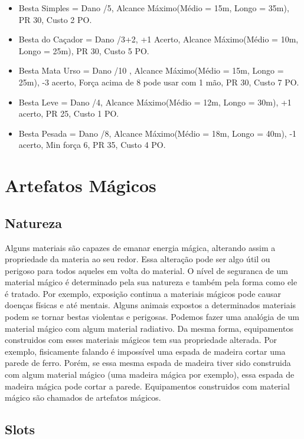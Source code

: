 \begin{itemize}	
	\item Besta Simples = Dano /5, Alcance Máximo(Médio = 15m, Longo = 35m), PR 30, Custo 2 PO.	
	\item Besta do Caçador = Dano /3+2, +1 Acerto, Alcance Máximo(Médio  = 10m, Longo = 25m), PR 30, Custo 5 PO.
	\item Besta Mata Urso = Dano /10 , Alcance Máximo(Médio  = 15m, Longo = 25m), -3 acerto, Força acima de 8 pode usar com 1 mão, PR 30, Custo 7 PO.
	\item Besta Leve = Dano /4, Alcance Máximo(Médio = 12m, Longo = 30m), +1 acerto, PR 25, Custo 1 PO.
	\item Besta Pesada = Dano /8, Alcance Máximo(Médio = 18m, Longo = 40m), -1 acerto, Min força 6, PR 35, Custo 4 PO.
\end{itemize}	



\section{Artefatos Mágicos}


\subsection{Natureza}
Alguns materiais são capazes de emanar energia mágica, alterando assim a propriedade da materia ao seu redor. Essa alteração pode ser algo útil ou perigoso para todos aqueles em volta do material. O nível de seguranca de um material mágico é determinado pela sua natureza e também pela forma como ele é tratado. Por exemplo, exposição continua a materiais mágicos pode causar doenças físicas e até mentais. Alguns animais expostos a determinados materiais podem se tornar bestas violentas e perigosas. Podemos fazer uma analógia de um material mágico com algum material radiativo. Da mesma forma, equipamentos construidos com esses materiais mágicos tem sua propriedade alterada. Por exemplo, fisicamente falando é impossível uma espada de madeira cortar uma parede de ferro. Porém, se essa mesma espada de madeira tiver sido construida com algum material mágico (uma madeira mágica por exemplo), essa espada de madeira mágica pode cortar a parede. Equipamentos construidos com material mágico são chamados de artefatos mágicos.

\subsection{Slots}

